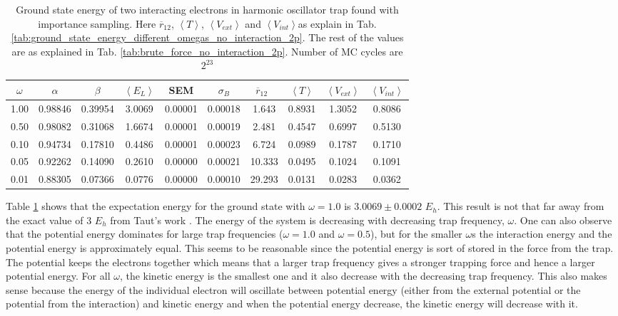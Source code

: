 \begin{table}[H]\caption{Ground state energy of two interacting electrons in harmonic oscillator trap found with importance sampling. Here $\overline{r}_{12}$,  $\left< T \right>$, $\left< V_{ext}\right>$  and $\left<V_{int} \right>$as explain in Tab. \ref{tab:ground_state_energy_different_omegas_no_interaction_2p}. The rest of the values are as explained in Tab. \ref{tab:brute_force_no_interaction_2p}. Number of MC cycles are $2^{23}$}\label{tab:ground_state_energy_importance_interaction}
\center
\begin{tabular}{c|ccccccccc}
$\omega$ & $\alpha$ & $\beta$ & $\left< E_L \right>$ & SEM & $\sigma_B$ &  $\overline{r}_{12} \,\,\,$ & $\left< T \right>$  & $\left< V_{ext}\right>$ & $\left<V_{int} \right>$  \\ \hline
1.00 & 0.98846 & 0.39954 & 3.0069 & 0.00001 & 0.00018 & 1.643 & 0.8931 & 1.3052 & 0.8086\\
0.50& 0.98082 & 0.31068 & 1.6674 & 0.00001 & 0.00019 & 2.481 & 0.4547 & 0.6997 & 0.5130\\
0.10 & 0.94734 & 0.17810 & 0.4486 & 0.00001 & 0.00023 & 6.724 & 0.0989 & 0.1787 & 0.1710\\
0.05 & 0.92262 & 0.14090 & 0.2610 & 0.00000 & 0.00021 & 10.333 & 0.0495 & 0.1024 & 0.1091\\
0.01 & 0.88305 & 0.07366 & 0.0776 & 0.00000 & 0.00010 & 29.293 & 0.0131 & 0.0283 & 0.0362\\
\end{tabular}
\end{table}


Table \ref{tab:ground_state_energy_importance_interaction} shows that the expectation energy for the ground state with $\omega = 1.0$ is $3.0069 \pm 0.0002$ $E_h$. This result is not that far away from the exact value of $3$ $E_h$ from Taut's work \cite{taut1993two}. The energy of the system is decreasing with decreasing trap frequency, $\omega$. One can also observe that the potential energy dominates for large trap frequencies ($\omega = 1.0$ and $\omega = 0.5$), but for the smaller $\omega$s the interaction energy and the potential energy is approximately equal.  This seems to be reasonable since the potential energy is sort of stored in the force from the trap. The potential keeps the electrons together which means that a larger trap frequency gives a stronger trapping force and hence a larger potential energy.  For all $\omega$, the kinetic energy is the smallest one and it also decrease with the decreasing trap frequency. This also makes sense because the energy of the individual electron will oscillate between potential energy (either from the external potential or the potential from the interaction) and kinetic energy and when the potential energy decrease, the kinetic energy will decrease with it.

